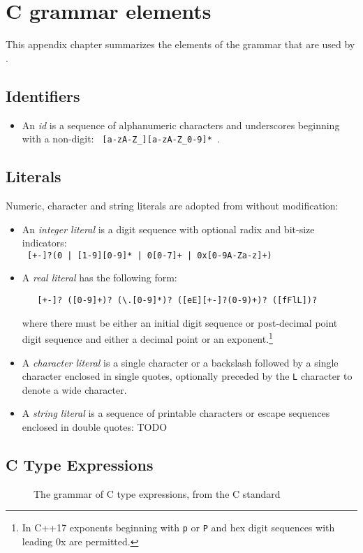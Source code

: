 \section{C grammar elements}
\label{sec:cgrammar}

This appendix chapter summarizes the elements of the \lang grammar that are used by \NAME.

\subsection{Identifiers}

\begin{itemize}
  \item  An \textit{id} is a sequence of alphanumeric characters and underscores beginning with a non-digit:  \lstinline| [a-zA-Z_][a-zA-Z_0-9]* |.
\end{itemize}

\subsection{Literals}

Numeric, character and string literals are adopted from \lang without modification:
\begin{itemize}
  \item An \textit{integer literal} is a digit sequence with optional radix and bit-size indicators: \\ \lstinline! [+-]?(0 | [1-9][0-9]* | 0[0-7]+ | 0x[0-9A-Za-z]+) !
  \item A \textit{real literal} has the following form:
 \begin{lstlisting}
   [+-]? ([0-9]+)? (\.[0-9]*)? ([eE][+-]?(0-9)+)? ([fFlL])?
   \end{lstlisting}
where there must be either an initial digit sequence or post-decimal point digit sequence and either a decimal point or an exponent.\footnote{In C++17 exponents beginning with \lstinline|p| or \lstinline|P| and hex digit sequences with leading 0x are permitted.}
  \item A \textit{character literal} is a single character or a backslash followed by a single character enclosed in single quotes, optionally 
  preceded by the \lstinline|L| character to denote a wide character.
  \item A \textit{string literal} is a sequence of printable characters or escape sequences enclosed in double quotes: TODO
\end{itemize}


\subsection{C Type Expressions}

\begin{figure}[htp]
  \begin{cadre}
    
  \end{cadre}
  \caption{The grammar of C type expressions, from the C standard}
\label{fig:gram:ctype}
\end{figure}


